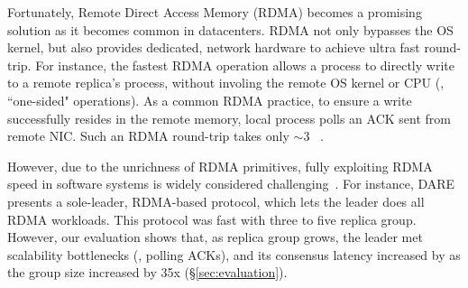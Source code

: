 



Fortunately, Remote Direct Access Memory (RDMA) becomes a promising solution 
as it becomes common in datacenters. RDMA not only bypasses the OS kernel, 
but also provides dedicated, network hardware to achieve ultra fast round-trip. 
For instance, the fastest RDMA operation allows a process to directly write to 
a remote replica's process, without involing the remote OS kernel or CPU (\ie, 
``one-sided" operations). As a common RDMA practice, to ensure a write 
successfully resides in the remote memory, local process polls an ACK sent 
from remote NIC. Such an RDMA round-trip takes only 
$\sim$3 \us~\cite{pilaf:usenix14}.


However, due to the unrichness of RDMA primitives, fully exploiting RDMA 
speed in software systems is widely 
considered challenging~\cite{pilaf:usenix14,herd:sigcomm14,
farm:sosp15,dare:hpdc15}. For instance, DARE~\cite{dare:hpdc15} presents a 
sole-leader, RDMA-based \paxos protocol, which lets the leader does all 
RDMA workloads. This protocol was fast with three to five replica group. 
However, our evaluation shows that, as replica group grows, the leader met 
scalability bottlenecks (\eg, polling ACKs), and its consensus latency 
increased by \darescalability as the group size increased by 35x 
(\S\ref{sec:evaluation}).

